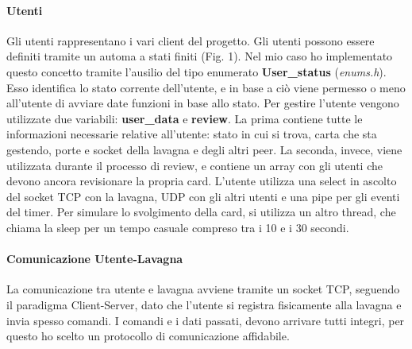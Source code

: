 \documentclass[11pt,a4paper,twocolumn,twoside]{paper}
\begin{document}
\paragraph{Utenti} 
    Gli utenti rappresentano i vari client del progetto. Gli utenti possono essere definiti tramite un automa a stati finiti (Fig. 1). Nel mio caso ho implementato questo concetto tramite l'ausilio del tipo enumerato \textbf{User\_status} (\textit{enums.h}). Esso identifica lo stato corrente dell'utente, e in base a ciò viene permesso o meno all'utente di avviare date funzioni in base allo stato. Per gestire l'utente vengono utilizzate due variabili: \textbf{user\_data} e \textbf{review}. La prima contiene tutte le informazioni necessarie relative all'utente: stato in cui si trova, carta che sta gestendo, porte e socket della lavagna e degli altri peer. La seconda, invece, viene utilizzata durante il processo di review, e contiene un array con gli utenti che devono ancora revisionare la propria card. L'utente utilizza una select in ascolto del socket TCP con la lavagna, UDP con gli altri utenti e una pipe per gli eventi del timer. Per simulare lo svolgimento della card, si utilizza un altro thread, che chiama la sleep per un tempo casuale compreso tra i 10 e i 30 secondi.
\paragraph{Comunicazione Utente-Lavagna}
    La comunicazione tra utente e lavagna avviene tramite un socket TCP, seguendo il paradigma Client-Server, dato che l'utente si registra fisicamente alla lavagna e invia spesso comandi. I comandi e i dati passati, devono arrivare tutti integri, per questo ho scelto un protocollo di comunicazione affidabile.
\end{document}

